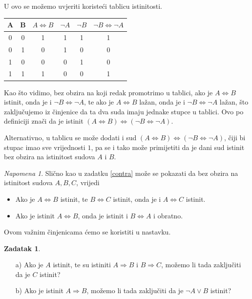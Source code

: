 \documentclass{book}
\renewenvironment{proof}{%
    \vspace{-\parskip}\begin{oldproof}%
    }{%
    \end{oldproof}%
}
\theoremstyle{definition}
\theoremstyle{definition}
\newtheorem{exercise}{Zadatak}
\theoremstyle{remark}
\newtheorem{remark}{Napomena}
\begin{document}
\begin{proof}[Rješenje]
U ovo se možemo uvjeriti koristeći tablicu istinitosti. 

\begin{center}
\begin{tabular}{ |c|c||c|c|c|c| } 
 \hline
 A & B & $A\Leftrightarrow B$ & $\neg A$ & $\neg B$ & $\neg B\Leftrightarrow \neg A$\\
 \hline \hline
 0 & 0 & 1 & 1 & 1 & 1 \\ 
 0 & 1 & 0 & 1 & 0 & 0 \\ 
 1 & 0 & 0 & 0 & 1 & 0 \\
 1 & 1 & 1 & 0 & 0 & 1 \\
 \hline
\end{tabular}
\end{center}
Kao što vidimo, bez obzira na koji redak promotrimo u tablici, ako je $A\Leftrightarrow B$ istinit, onda je i $\neg B\Leftrightarrow \neg A$, te ako je $A\Leftrightarrow B$ lažan, onda je i $\neg B\Leftrightarrow \neg A$ lažan, što zaključujemo iz činjenice da ta dva suda imaju jednake stupce u tablici. Ovo po definiciji znači da je istinit $(A\Leftrightarrow B)\Leftrightarrow (\neg B\Leftrightarrow \neg A)$. 

Alternativno, u tablicu se može dodati i sud $(A\Leftrightarrow B)\Leftrightarrow (\neg B\Leftrightarrow \neg A)$, čiji bi stupac imao sve vrijednosti $1$, pa se i tako može primijetiti da je dani sud istinit bez obzira na istinitost sudova $A$ i $B$.
\end{proof}
\begin{remark}
\label{equivtransitivity}
Slično kao u zadatku \ref{contra} može se pokazati da bez obzira na istinitost sudova $A,B,C$, vrijedi
\begin{itemize}
\item Ako je $A\Leftrightarrow B$ istinit, te $B\Leftrightarrow C$ istinit, onda je i $A\Leftrightarrow C$ istinit.
\item Ako je istinit $A\Leftrightarrow B$, onda je istinit i $B\Leftrightarrow A$ i obratno.
\end{itemize}
Ovom važnim činjenicama ćemo se koristiti u nastavku.
\end{remark}
\begin{exercise} \textbf{}
\begin{itemize}
\item[a)] Ako je $A$ istinit, te su istiniti $A\Rightarrow B$ i $B\Rightarrow C$, možemo li tada zaključiti da je $C$ istinit?
\item[b)] Ako je istinit $A\Rightarrow B$, možemo li tada zaključiti da je $\neg A\vee B$ istinit?
\end{itemize}
\end{exercise}
\end{document}
